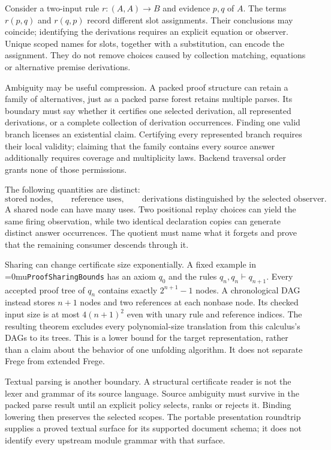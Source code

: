 \documentclass[11pt,a4paper]{article}
\newcommand{\name}[1]{\textup{\Urlmuskip=0mu\relax\nolinkurl{#1}}}
\begin{document}
Consider a two-input rule $r:(A,A)\to B$ and evidence $p,q$ of $A$.
The terms $r(p,q)$ and $r(q,p)$ record different slot assignments. Their
conclusions may coincide; identifying the derivations requires an explicit
equation or observer. Unique scoped names for slots, together with a
substitution, can encode the assignment. They do not remove choices caused
by collection matching, equations or alternative premise derivations.

Ambiguity may be useful compression. A packed proof structure can retain a
family of alternatives, just as a packed parse forest retains multiple parses.
Its boundary must say whether it certifies one selected derivation, all
represented derivations, or a complete collection of derivation occurrences.
Finding one valid branch licenses an existential claim. Certifying every
represented branch requires their local validity; claiming that the family
contains every source answer additionally requires coverage and multiplicity
laws. Backend traversal order grants none of those permissions.

The following quantities are distinct:
\[
 \text{stored nodes},\qquad \text{reference uses},\qquad
 \text{derivations distinguished by the selected observer}.
\]
A shared node can have many uses. Two positional replay choices can yield the
same firing observation, while two identical declaration copies can generate
distinct answer occurrences. The quotient must name what it forgets and prove
that the remaining consumer descends through it.

Sharing can change certificate size exponentially. A fixed example in
\name{ProofSharingBounds} has an axiom $q_0$ and the rules
$q_n,q_n\vdash q_{n+1}$. Every accepted proof tree of $q_n$ contains exactly
$2^{n+1}-1$ nodes. A chronological DAG instead stores $n+1$ nodes and two
references at each nonbase node. Its checked input size is at most
$4(n+1)^2$ even with unary rule and reference indices. The resulting theorem
excludes every polynomial-size translation from this calculus's DAGs to its
trees. This is a lower bound for the target representation, rather than a
claim about the behavior of one unfolding algorithm. It does not separate
Frege from extended Frege.

Textual parsing is another boundary. A structural certificate reader is not
the lexer and grammar of its source language. Source ambiguity must survive
in the packed parse result until an explicit policy selects, ranks or rejects
it. Binding lowering then preserves the selected scopes. The portable
presentation roundtrip supplies a proved textual surface for its supported
document schema; it does not identify every upstream module grammar with that
surface.
\end{document}
